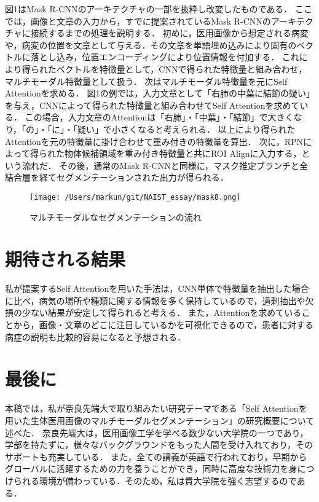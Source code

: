 \documentclass[a4j,10pt,twocolumn]{jarticle}
\begin{document}
図1はMask R-CNNのアーキテクチャの一部を抜粋し改変したものである．
ここでは，画像と文章の入力から，すでに提案されているMask R-CNNのアーキテクチャに接続するまでの処理を説明する．
初めに，医用画像から想定される病変や，病変の位置を文章として与える．その文章を単語埋め込み\cite{堅山耀太郎2017word}により固有のベクトルに落とし込み，位置エンコーディングにより位置情報を付加する．
これにより得られたベクトルを特徴量として，CNNで得られた特徴量と組み合わせ，マルチモーダル特徴量として扱う．
次はマルチモーダル特徴量を元にSelf Attentionを求める．
図1の例では，入力文章として「右肺の中葉に結節の疑い」を与え，CNNによって得られた特徴量と組み合わせてSelf Attentionを求めている．
この場合，入力文章のAttentionは「右肺」・「中葉」・「結節」で大きくなり，「の」・「に」・「疑い」で小さくなると考えられる．
以上により得られたAttentionを元の特徴量に掛け合わせて重み付きの特徴量を算出．
次に，RPN\cite{ren2015faster}によって得られた物体候補領域を重み付き特徴量と共にROI Alignに入力する，という流れだ．
その後，通常のMask R-CNNと同様に，マスク推定ブランチと全結合層を経てセグメンテーションされた出力が得られる．
\begin{figure}[hb]%
    \centering\texttt{[image: /Users/markun/git/NAIST\_essay/mask8.png]}
    \caption{マルチモーダルなセグメンテーションの流れ}
\end{figure}
\vspace{-1zh}
\section{期待される結果}
私が提案するSelf Attentionを用いた手法は，CNN単体で特徴量を抽出した場合に比べ，病気の場所や種類に関する情報を多く保持しているので，過剰抽出や欠損の少ない結果が安定して得られると考える．
また，Attentionを求めていることから，画像・文章のどこに注目しているかを可視化できるので，患者に対する病症の説明も比較的容易になると予想される．

\section{最後に}
本稿では，私が奈良先端大で取り組みたい研究テーマである「Self Attentionを用いた生体医用画像のマルチモーダルセグメンテーション」の研究概要について述べた．
奈良先端大は，医用画像工学を学べる数少ない大学院の一つであり，学部を持たずに，様々なバックグラウンドをもった人間を受け入れており，そのサポートも充実している．
また，全ての講義が英語で行われており，早期からグローバルに活躍するための力を養うことができ，同時に高度な技術力を身につけられる環境が備わっている．そのため，私は貴大学院を強く志望するのである．

{\scriptsize


\makeatletter
 \renewcommand{\@cite}[2]{\leavevmode%
 \hbox{$^{\mbox{\the\scriptfont0 #1}}$}}
\makeatother
}
\end{document}
